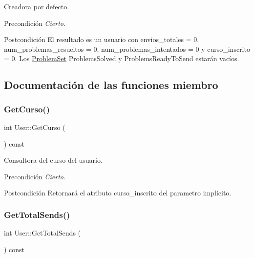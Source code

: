 Creadora por defecto. 

\begin{DoxyPrecond}{Precondición}
{\itshape Cierto.} 
\end{DoxyPrecond}
\begin{DoxyPostcond}{Postcondición}
El resultado es un usuario con envios\+\_\+totales = 0, num\+\_\+problemas\+\_\+resueltos = 0, num\+\_\+problemas\+\_\+intentados = 0 y curso\+\_\+inscrito = 0. Los \mbox{\hyperlink{class_problem_set}{Problem\+Set}} Problems\+Solved y Problems\+Ready\+To\+Send estarán vacíos. 
\end{DoxyPostcond}


\subsection{Documentación de las funciones miembro}
\mbox{\label{class_user_a7e91af81476c9ae37cd2bad99862fc8f}} 
\subsubsection{\texorpdfstring{Get\+Curso()}{GetCurso()}}
{\footnotesize\ttfamily int User\+::\+Get\+Curso (\begin{DoxyParamCaption}{ }\end{DoxyParamCaption}) const}



Consultora del curso del usuario. 

\begin{DoxyPrecond}{Precondición}
{\itshape Cierto.} 
\end{DoxyPrecond}
\begin{DoxyPostcond}{Postcondición}
Retornará el atributo curso\+\_\+inscrito del parametro implícito. 
\end{DoxyPostcond}
\mbox{\label{class_user_aa9e61fa20b935204897891e161a75286}} 
\subsubsection{\texorpdfstring{Get\+Total\+Sends()}{GetTotalSends()}}
{\footnotesize\ttfamily int User\+::\+Get\+Total\+Sends (\begin{DoxyParamCaption}{ }\end{DoxyParamCaption}) const}



